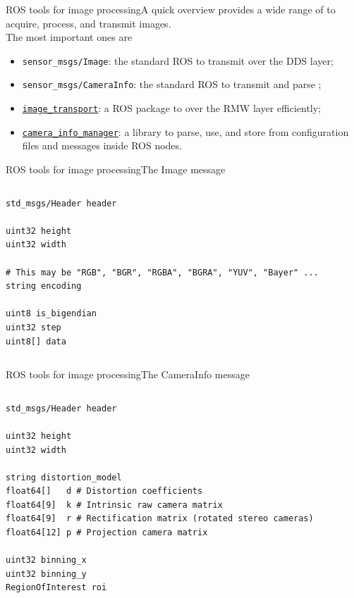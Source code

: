 \begin{frame}{ROS tools for image processing}{A quick overview}
  \justifying
	 provides a wide range of  to acquire, process, and transmit images.\\
  The most important ones are
	\begin{itemize}
		\item \texttt{sensor\_msgs/Image}: the standard ROS  to transmit  over the DDS layer;
		\item \texttt{sensor\_msgs/CameraInfo}: the standard ROS  to transmit and parse ;
		\item \href{https://wiki.ros.org/image_transport}{\color{blue}\underline{\texttt{image\_transport}}}: a ROS package to  over the RMW layer efficiently;
		\item \href{https://wiki.ros.org/camera_info_manager}{\color{blue}\underline{\texttt{camera\_info\_manager}}}: a library to parse, use, and store  from configuration files and messages inside ROS nodes.
	\end{itemize}
\end{frame}
\begin{frame}[fragile]{ROS tools for image processing}{The Image message}
	\begin{columns}
		\begin{lstlisting}[language=ros2msg, caption=Definition of the \texttt{sensor\_msgs/msg/Image} message.]
std_msgs/Header header

uint32 height
uint32 width

# This may be "RGB", "BGR", "RGBA", "BGRA", "YUV", "Bayer" ...
string encoding

uint8 is_bigendian
uint32 step
uint8[] data
\end{lstlisting}
	\end{columns}
\end{frame}
\begin{frame}[fragile]{ROS tools for image processing}{The CameraInfo message}
	\begin{columns}
		\column{.9\textwidth}
		\begin{lstlisting}[language=ros2msg, caption=Definition of the \texttt{sensor\_msgs/msg/CameraInfo} message; go have a look at it.]
std_msgs/Header header

uint32 height
uint32 width

string distortion_model
float64[]   d # Distortion coefficients
float64[9]  k # Intrinsic raw camera matrix
float64[9]  r # Rectification matrix (rotated stereo cameras)
float64[12] p # Projection camera matrix

uint32 binning_x
uint32 binning_y
RegionOfInterest roi
\end{lstlisting}
	\end{columns}
\end{frame}

